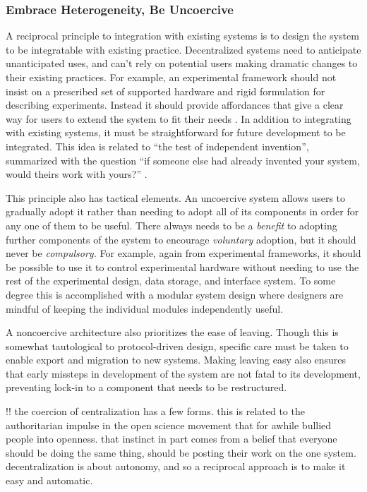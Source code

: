 \documentclass[11pt]{article}
\begin{document}
\begin{multicols}{2}
\hypertarget{embrace-heterogeneity-be-uncoercive}{%
\subsubsection{Embrace Heterogeneity, Be
Uncoercive}\label{embrace-heterogeneity-be-uncoercive}}

A reciprocal principle to integration with existing systems is to design
the system to be integratable with existing practice. Decentralized
systems need to anticipate unanticipated uses, and can't rely on
potential users making dramatic changes to their existing practices. For
example, an experimental framework should not insist on a prescribed set
of supported hardware and rigid formulation for describing experiments.
Instead it should provide affordances that give a clear way for users to
extend the system to fit their needs \cite{carpenterRFC1958Architectural1996} . In addition to integrating with
existing systems, it must be straightforward for future development to
be integrated. This idea is related to ``the test of independent
invention'', summarized with the question ``if someone else had already
invented your system, would theirs work with yours?'' \cite{berners-leePrinciplesDesign1998} .

This principle also has tactical elements. An uncoercive system allows
users to gradually adopt it rather than needing to adopt all of its
components in order for any one of them to be useful. There always needs
to be a \emph{benefit} to adopting further components of the system to
encourage \emph{voluntary} adoption, but it should never be
\emph{compulsory.} For example, again from experimental frameworks, it
should be possible to use it to control experimental hardware without
needing to use the rest of the experimental design, data storage, and
interface system. To some degree this is accomplished with a modular
system design where designers are mindful of keeping the individual
modules independently useful.

A noncoercive architecture also prioritizes the ease of leaving. Though
this is somewhat tautological to protocol-driven design, specific care
must be taken to enable export and migration to new systems. Making
leaving easy also ensures that early missteps in development of the
system are not fatal to its development, preventing lock-in to a
component that needs to be restructured.

!! the coercion of centralization has a few forms. this is related to
the authoritarian impulse in the open science movement that for awhile
bullied people into openness. that instinct in part comes from a belief
that everyone should be doing the same thing, should be posting their
work on the one system. decentralization is about autonomy, and so a
reciprocal approach is to make it easy and automatic.


\end{multicols}
\end{document}
